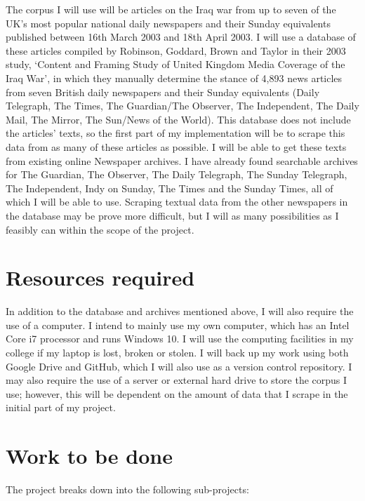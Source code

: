 \documentclass[12pt,a4paper,twoside]{article}
\begin{document}
The corpus I will use will be articles on the Iraq war from up to seven of the UK’s most popular national daily newspapers and their Sunday equivalents published between 16th March 2003 and 18th April 2003. I will use a database of these articles compiled by Robinson, Goddard, Brown and Taylor in their 2003 study, ‘Content and Framing Study of United Kingdom Media Coverage of the Iraq War’, in which they manually determine the stance of 4,893 news articles from seven British daily newspapers and their Sunday equivalents (Daily Telegraph, The Times, The Guardian/The Observer, The Independent, The Daily Mail, The Mirror, The Sun/News of the World). This database does not include the articles’ texts, so the first part of my implementation will be to scrape this data from as many of these articles as possible. I will be able to get these texts from existing online Newspaper archives. I have already found searchable archives for The Guardian, The Observer, The Daily Telegraph, The Sunday Telegraph, The Independent, Indy on Sunday, The Times and the Sunday Times, all of which I will be able to use. Scraping textual data from the other newspapers in the database may be prove more difficult, but I will as many possibilities as I feasibly can within the scope of the project.

\section*{Resources required}
In addition to the database and archives mentioned above, I will also require the use of a computer. I intend to mainly use my own computer, which has an Intel Core i7 processor and runs Windows 10. I will use the computing facilities in my college if my laptop is lost, broken or stolen. I will back up my work using both Google Drive and GitHub, which I will also use as a version control repository. I may also require the use of a server or external hard drive to store the corpus I use; however, this will be dependent on the amount of data that I scrape in the initial part of my project.

\section*{Work to be done}
The project breaks down into the following sub-projects:
\end{document}
